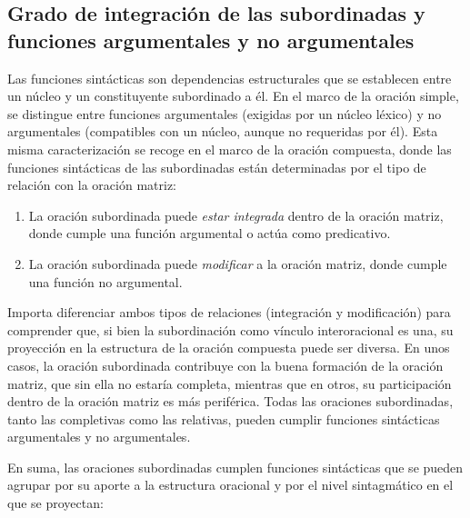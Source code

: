 \subsection{Grado de integración de las subordinadas y funciones argumentales y no argumentales}\label{sec:13-integracion}

Las funciones sintácticas son dependencias estructurales que se establecen entre
un núcleo y un constituyente subordinado a él. En el marco de la oración simple,
se distingue entre funciones argumentales (exigidas por un núcleo léxico) y no
argumentales (compatibles con un núcleo, aunque no requeridas por él). Esta misma
caracterización se recoge en el marco de la oración compuesta, donde las
funciones sintácticas de las subordinadas están determinadas por el tipo de
relación con la oración matriz:

\begin{enumerate}[label=(\alph*)]
  \item La oración subordinada puede \textit{estar integrada} dentro de la
        oración matriz, donde cumple una función argumental o actúa como
        predicativo.
  \item La oración subordinada puede \textit{modificar} a la oración matriz,
        donde cumple una función no argumental.
\end{enumerate}

Importa diferenciar ambos tipos de relaciones (integración y modificación) para
comprender que, si bien la subordinación como vínculo interoracional es una, su
proyección en la estructura de la oración compuesta puede ser diversa. En unos
casos, la oración subordinada contribuye con la buena formación de la oración
matriz, que sin ella no estaría completa, mientras que en otros, su participación
dentro de la oración matriz es más periférica. Todas las oraciones subordinadas,
tanto las completivas como las relativas, pueden cumplir funciones sintácticas
argumentales y no argumentales.

En suma, las oraciones subordinadas cumplen funciones sintácticas que se pueden
agrupar por su aporte a la estructura oracional y por el nivel sintagmático en
el que se proyectan:

